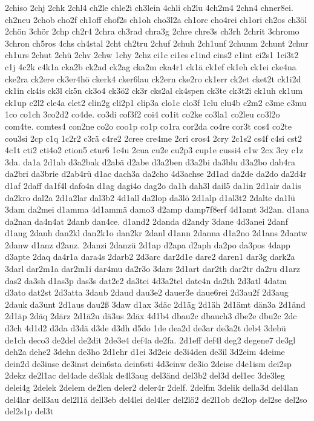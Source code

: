 {2chiso
2chj
2chk
2chl4
ch2le
chle2i
ch3lein
4chli
ch2lu
4ch2m4
2chn4
chner8ei.
ch2neu
2chob
cho2f
ch1off
chof2s
ch1oh
cho3l2a
ch1orc
cho4rei
ch1ori
ch2os
ch3öl
2chön
3chör
2chp
ch2r4
2chra
ch3rad
chra3g
2chre
chre3s
ch3rh
2chrit
3chromo
3chron
ch5ros
4chs
ch4stal
2cht
ch2tru
2chuf
2chuh
2ch1unf
2chunm
2chunt
2chur
ch1urs
2chut
2chü
2chv
2chw
1chy
2chz
ci1c
ci1es
c1ind
cins2
c1int
ci2s1
1ci3t2
c1j
4c2k
c4k1a
cka2b
ck2ad
ck2ag
cka2m
cka4r1
ck1ä
ck1ef
ck1eh
ck1ei
cke4na
cke2ra
ck2ere
ck3er4hö
ckerk4
cker6lau
ck2ern
cke2ro
ck1err
ck2et
cket2t
ck1i2d
ck1in
ck4is
ck3l
ck5n
ck3o4
ck3ö2
ck3r
cks2al
ck4spen
ck3te
ck3t2i
ck1uh
ck1um
ck1up
c2l2
cle4a
clet2
clin2g
cli2p1
clip3a
clo1c
clo3f
1clu
clu4b
c2m2
c3me
c3mu
1co
co1ch
3co2d2
co4de.
co3di
cof3f2
coi4
co1it
co2ke
co3la1
co2leu
co3l2o
com4te.
comtes4
con2ne
co2o
coo1p
co1p
co1ra
cor2da
co4re
cor3t
cos4
co2te
cou3si
2cp
c1q
1c2r2
c3rä
c4re2
2cree
cre4me
2cri
cros4
2cry
2c1s2
cs4f
c4si
cst2
4c1t
cti2
cti4o2
ction5
ctur6
1c4u
2cua
cu2e
cu2p3
cup1e
cussi4
c1w
2cx
3cy
c1z
3da.
da1a
2d1ab
d3a2bak
d2abä
d2abe
d3a2ben
d3a2bi
da3blu
d3a2bo
dab4ra
da2bri
da3brie
d2ab4rü
d1ac
dach3a
da2cho
4d3achse
2d1ad
da2de
da2do
da2d4r
d1af
2daff
da1f4l
dafo4n
d1ag
dagi4o
dag2o
da1h
dah3l
dail5
da1in
2d1air
da1is
da2kro
dal2a
2d1a2lar
dal3b2
4d1all
da2lop
da3lö
2d1alp
d1al3t2
2dalte
da1lü
3dam
da2mei
d1amma
4d1ammä
damo3
d2amp
damp7f8erf
4d1amt
3d2an.
d1ana
da2nan
da4n4at
2danb
dan4ce.
d1and2
2danda
d2andy
3dane
4d3anei
2danf
d1ang
2danh
dan2kl
dan2k1o
dan2kr
2danl
d1ann
2danna
d1a2no
2d1ans
2dantw
2danw
d1anz
d2anz.
2danzi
2danzü
2d1ap
d2apa
d2aph
da2po
da3pos
4dapp
d3apte
2daq
da4r1a
dara4s
2darb2
2d3arc
dar2d1e
dare2
daren1
dar3g
dark2a
3darl
dar2m1a
dar2m1i
dar4mu
da2r3o
3dars
2d1art
dar2th
dar2tr
da2ru
d1arz
das2
da3sh
d1as3p
das3s
dat2e2
da3tei
4d3a2tel
date4n
da2th
2d3atl
4datm
d3ato
dat2st
2d3atta
3daub
2daud
dau3e2
dauer3e
daue6rei
2d3au2f
2d3aug
2dauk
da3unt
2d1aus
dau2ß
3daw
d1ax
3däc
2d1äg
2d1äh
2d1ämt
dän3a
2d1änd
2d1äp
2däq
2därz
2d1ä2u
dä3us
2däx
4d1b4
dbau2c
dbauch3
dbe2e
dbu2c
2dc
d3ch
4d1d2
d3da
d3dä
d3de
d3dh
d5do
1de
dea2d
de3ar
de3a2t
deb4
3debü
de1ch
deco3
de2del
de2dit
2de3e4
def4a
de2fa.
2d1eff
def4l
deg2
degene7
de3gl
deh2a
dehe2
3dehn
de3ho
2d1ehr
d1ei
3d2eic
de3i4den
de3il
3d2eim
4deime
dein2d
de3inse
de3inst
dein6sta
dein6sti
4d3einw
de3io
2deise
d4e1ism
dei2sp
2dekz
de2l1ac
del4ade
de3lak
de4l3aug
del3änd
del3b2
del3d
del1ec
3de3leg
delei4g
2delek
2delem
de2len
deler2
deler4r
2delf.
2delfm
3delik
della3d
del4lan
del4lar
dell3au
del2l1ä
dell3eb
del4lei
del4ler
del2lö2
de2l1ob
de2lop
del2se
del2so
del2s1p
del3t
}
